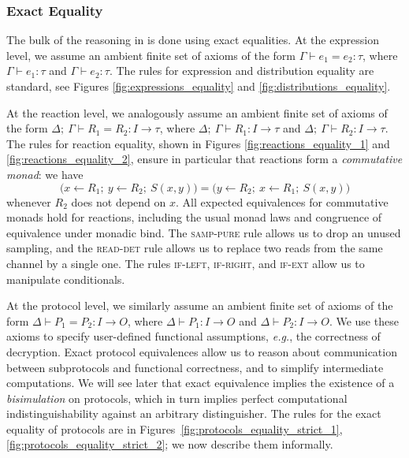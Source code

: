 \subsubsection{Exact Equality}
The bulk of the reasoning in \ipdl is done using exact equalities. At the expression level, we assume an ambient finite set of axioms of the form $\Gamma \vdash e_1 = e_2 : \tau$, where $\Gamma \vdash e_1 : \tau$ and $\Gamma \vdash e_2 : \tau$. The rules for expression and distribution equality are standard, see Figures \ref{fig:expressions_equality} and \ref{fig:distributions_equality}.

At the reaction level, we analogously assume an ambient finite set of axioms of the form $\Delta; \ \Gamma \vdash R_1 = R_2 : I \to \tau$, where $\Delta; \ \Gamma \vdash R_1 : I \to \tau$ and $\Delta; \ \Gamma \vdash R_2 : I \to \tau$. The rules for reaction equality, shown in Figures \ref{fig:reactions_equality_1} and \ref{fig:reactions_equality_2}, ensure in particular that reactions form a \emph{commutative monad}: we have \[\big(x \leftarrow R_1; \ y \leftarrow R_2; \ S(x,y)\big) = \big(y \leftarrow R_2; \ x \leftarrow R_1; \ S(x,y)\big)\] whenever $R_2$ does not depend on $x$. All expected equivalences for commutative monads hold for reactions, including the usual monad laws and congruence of equivalence under monadic bind. The \textsc{samp-pure} rule allows us to drop an unused sampling, and the \textsc{read-det} rule allows us to replace two reads from the same channel by a single one. The rules \textsc{if-left}, \textsc{if-right}, and \textsc{if-ext} allow us to manipulate conditionals.

At the protocol level, we similarly assume an ambient finite set of axioms of the form $\Delta \vdash P_1 = P_2 : I \to O$, where $\Delta \vdash P_1 : I \to O$ and $\Delta \vdash P_2 : I \to O$. We use these axioms to specify user-defined functional assumptions, \emph{e.g.}, the correctness of decryption. Exact protocol equivalences allow us to reason about communication between subprotocols and functional correctness, and to simplify intermediate computations. We will see later that exact equivalence implies the existence of a \emph{bisimulation} on protocols, which in turn implies perfect computational indistinguishability against an arbitrary distinguisher. The rules for the exact equality of protocols are in Figures~\ref{fig:protocols_equality_strict_1}, \ref{fig:protocols_equality_strict_2}; we now describe them informally.

